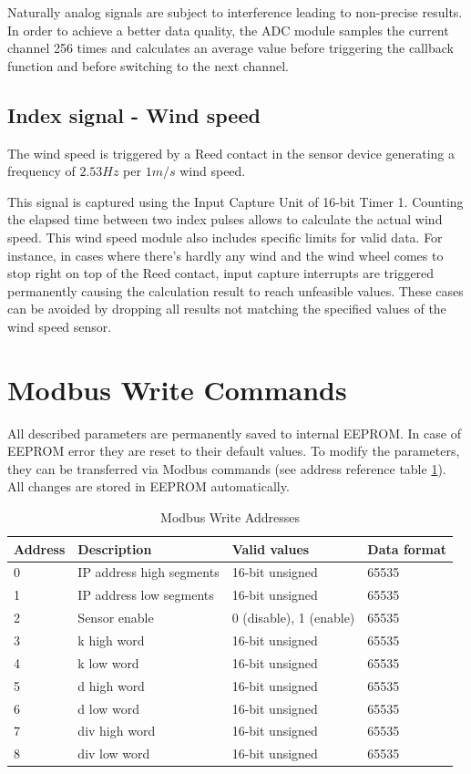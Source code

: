 Naturally analog signals are subject to interference leading to non-precise results. In order to achieve a better data quality, the ADC module samples the current channel 256 times and calculates an average value before triggering the callback function and before switching to the next channel.

\subsection{Index signal - Wind speed}
The wind speed is triggered by a Reed contact in the sensor device generating a frequency of $2.53 Hz$ per $1 m/s$ wind speed.

This signal is captured using the Input Capture Unit of 16-bit Timer 1. Counting the elapsed time between two index pulses allows to calculate the actual wind speed. This wind speed module also includes specific limits for valid data. For instance, in cases where there's hardly any wind and the wind wheel comes to stop right on top of the Reed contact, input capture interrupts are triggered permanently causing the calculation result to reach unfeasible values. These cases can be avoided by dropping all results not matching the specified values of the wind speed sensor.

\section{Modbus Write Commands}
All described parameters are permanently saved to internal EEPROM. In case of EEPROM error they are reset to their default values. To modify the parameters, they can be transferred via Modbus commands (see address reference table \ref{tab:modbus_write}). All changes are stored in EEPROM automatically.

\begin{table}[ht]
    \centering
    \begin{tabular}{|l|l|l|l|}
    \hline \textbf{Address} & \textbf{Description} & \textbf{Valid values} & \textbf{Data format} \\ 
    \hline
    \hline 0 & IP address high segments & 16-bit unsigned & 65535 \\ 
    \hline 1 & IP address low segments & 16-bit unsigned & 65535 \\ 
    \hline 2 & Sensor enable & 0 (disable), 1 (enable) & 65535 \\ 
    \hline 3 & k high word & 16-bit unsigned & 65535 \\ 
    \hline 4 & k low word & 16-bit unsigned & 65535 \\ 
    \hline 5 & d high word & 16-bit unsigned & 65535 \\ 
    \hline 6 & d low word & 16-bit unsigned & 65535 \\ 
    \hline 7 & div high word & 16-bit unsigned & 65535 \\ 
    \hline 8 & div low word & 16-bit unsigned & 65535 \\ 
    \hline 
    \end{tabular}
    \caption{Modbus Write Addresses}
    \label{tab:modbus_write}
\end{table}

